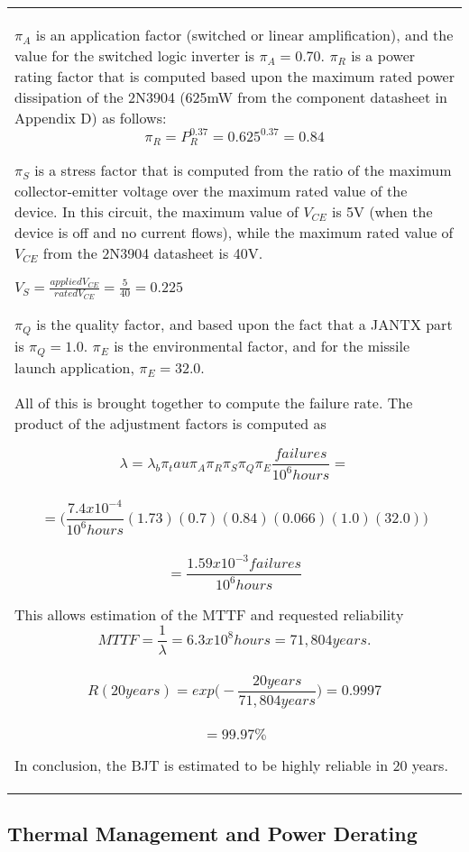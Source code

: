 \begin{table}
\begin{tabular}{m{15cm}|}
$\pi_A$ is an application factor
(switched or linear amplification), and the value for the switched logic
inverter is $\pi_A = 0.70$.  $\pi_R$ is a power rating factor that is
computed based upon the maximum rated power dissipation of the 2N3904
(625mW from the component datasheet in Appendix D) as follows:
$$\pi_R = P_R^{0.37} = 0.625^{0.37} = 0.84$$


$\pi_S$ is a stress factor that is
computed from the ratio of the maximum collector-emitter voltage over
the maximum rated value of the device. In this circuit, the maximum
value of $V_{CE}$ is 5V (when the device
is off and no current flows), while the maximum rated value of
$V_{CE}$ from the 2N3904 datasheet is 40V.

$V_S = \frac{applied V_{CE}}{rated V_{CE}} = \frac{5}{40} = 0.225$

$\pi_Q$ is the quality factor, and based upon the fact that a JANTX part is 
$\pi_Q = 1.0$.  $\pi_E$ is the environmental factor, and
for the missile launch application, $\pi_E = 32.0$.

All of this is brought together to compute the failure rate. The product
of the adjustment factors is computed as

$$\lambda=\lambda_b \pi_tau \pi_A \pi_R \pi_S \pi_Q \pi_E \frac{failures}{10^6 hours} = $$\\
$$	= \big( \frac{7.4x10^{-4}}{10^6 hours} (1.73)(0.7)(0.84)(0.066)(1.0)(32.0) \big) $$\\
$$	= \frac{1.59x10^{-3} failures}{10^6 hours}$$

This allows estimation of the MTTF and requested reliability
$$	MTTF = \frac{1}{\lambda} = 6.3x10^8 hours = 71,804 years. $$\\
$$	R(20 years) = exp \big( -\frac{20 years}{71,804 years} \big) = 0.9997 $$\\
$$	= 99.97\%$$

In conclusion, the BJT is estimated to be highly reliable in 20 years.

\end{tabular}
\end{table}



\subsection{Thermal Management and Power Derating}
\label{subsection:thermal-management-and-power-derating}


